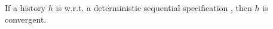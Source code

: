 






\begin{lemma}
\label{lemma:distributed linarizability implies convergence}
If a history $h$ is \crdtlinearizable{} w.r.t. a deterministic
sequential specification \Spec, then $h$ is convergent.
\end{lemma}

